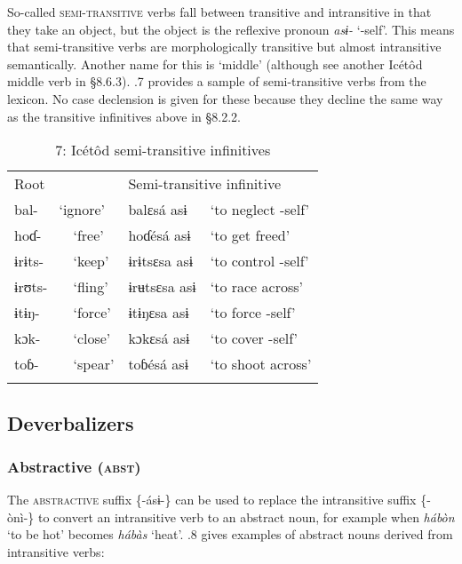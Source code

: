 \begin{table}
So-called \textsc{semi-transitive }verbs fall between transitive and intransitive in that they take an object, but the object is the reflexive pronoun \textit{asɨ- }‘-self’. This means that semi-transitive verbs are morphologically transitive but almost intransitive semantically. Another name for this is ‘middle’ (although see another Icétôd middle verb in §8.6.3). .7 provides a sample of semi-transitive verbs from the lexicon. No case declension is given for these because they decline the same way as the transitive infinitives above in §8.2.2.


\begin{table}
\caption{7: Icétôd semi-transitive infinitives}
\label{tab:8}


\begin{tabularx}{\textwidth}{XXXXX}
\lsptoprule

Root & \multicolumn{2}{X}{} & \multicolumn{2}{X}{Semi-transitive infinitive}\\
bal- & \multicolumn{2}{X}{‘ignore’} & balɛsá asɨ & ‘to neglect -self’\\
\multicolumn{2}{X}{hoɗ-} & ‘free’ & hoɗésá asɨ & ‘to get freed’\\
\multicolumn{2}{X}{ɨrɨts-} & ‘keep’ & ɨrɨtsɛsa asɨ & ‘to control -self’\\
\multicolumn{2}{X}{ɨrʊts-} & ‘fling’ & ɨrʉtsɛsa asɨ & ‘to race across’\\
\multicolumn{2}{X}{ɨtɨŋ-} & ‘force’ & ɨtɨŋɛsa asɨ & ‘to force -self’\\
\multicolumn{2}{X}{kɔk-} & ‘close’ & kɔkɛsá asɨ & ‘to cover -self’\\
\multicolumn{2}{X}{toɓ-} & ‘spear’ & toɓésá asɨ & ‘to shoot across’\\
\lspbottomrule
\end{tabularx}
\end{table}



\subsection{Deverbalizers}
\subsubsection{Abstractive (\textsc{abst})}

The \textsc{abstractive} suffix \{-ásɨ-\} can be used to replace the intransitive suffix \{-ònì-\} to convert an intransitive verb to an abstract noun, for example when \textit{hábòn }‘to be hot’ becomes \textit{hábàs }‘heat’. .8 gives examples of abstract nouns derived from intransitive verbs:



\end{table}
